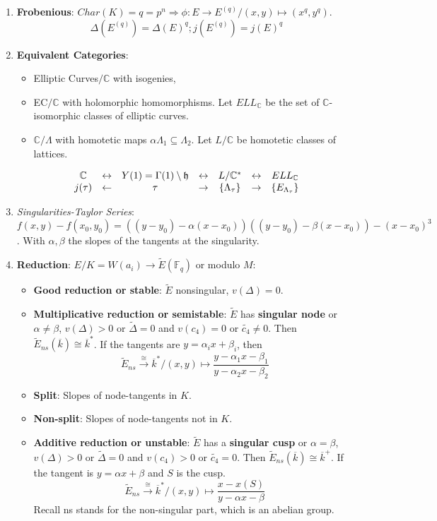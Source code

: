 \documentclass{article}
\newcommand{\C}{\mathbb{C}}
\newcommand{\F}{\mathbb{F}}
\newcommand{\hh}{\mathfrak{h}}
\newcommand{\ra}{\rightarrow}
\newcommand{\la}{\leftarrow}
\newcommand{\Ra}{\Rightarrow}
\newcommand{\lra}{\leftrightarrow}
\newcommand{\raa}[1]{\overset{#1}{\longrightarrow}}
\begin{document}
\begin{multicols}{2}
\begin{enumerate}
\item \textbf{Frobenious}: $Char(K) = q = p^n \Ra \phi: E \ra E^{(q)}/ (x,y) \mapsto (x^q,y^q)$. 
\[\Delta(E^{(q)}) = \Delta(E)^q; j(E^{(q)}) = j(E)^q\]

\item \textbf{Equivalent Categories}: 
\begin{itemize} 
\item Elliptic Curves$/\C$ with isogenies, 
\item EC$/\C$ with holomorphic homomorphisms. Let $ELL_\C$ be the set of $\C$-isomorphic classes of elliptic curves.  
\item $\C/\Lambda$ with homotetic maps $\alpha \Lambda_1 \subseteq \Lambda_2$. Let $L/\C$ be homotetic classes of lattices.
\end{itemize}
\[\begin{array}{ccc ccc cc}
\C & \lra & Y(1) = \Gamma(1)\setminus \hh & \lra & L/\C^* & \lra & ELL_\C \\
j(\tau) & \la & \tau & \ra & \{\Lambda_\tau\} & \ra & \{E_{\Lambda_\tau}\}
\end{array}\]

\item \textit{Singularities-Taylor Series}: $f(x,y) - f(x_0,y_0) = ((y-y_0)-\alpha(x-x_0))((y-y_0)-\beta(x-x_0)) - (x-x_0)^3$. With $\alpha,\beta$ the slopes of the tangents at the singularity.

\item \textbf{Reduction}: $E/K = W(a_i) \ra \tilde{E}(\F_q)$ or modulo $M$: 
\begin{itemize}
\item \textbf{Good reduction or stable}: $\tilde{E}$ nonsingular, $v(\Delta) = 0$. 
\item \textbf{Multiplicative reduction or semistable}: $\tilde{E}$ has \textbf{singular node} or $\alpha \neq \beta$, $v(\Delta) > 0$ or $\tilde{\Delta} = 0$ and $v(c_4) = 0$ or $\tilde{c_4} \neq 0$. Then $\tilde{E}_{ns}(\overline{k}) \cong \overline{k}^*$. If the tangents are $y = \alpha_i x + \beta_i$, then 
\[\tilde{E}_{ns} \raa{\cong} \overline{k}^*/ (x,y) \mapsto \frac{y - \alpha_1x-\beta_1}{y-\alpha_2 x - \beta_2}\]
\item \textbf{Split}: Slopes of node-tangents in $K$.
\item \textbf{Non-split}: Slopes of node-tangents not in $K$.
\item  \textbf{Additive reduction or unstable}: $\tilde{E}$ has a \textbf{singular cusp} or $\alpha = \beta$, $v(\Delta) > 0$ or $\tilde{\Delta} = 0$ and $v(c_4) > 0$ or $\tilde{c_4} = 0$. Then $\tilde{E}_{ns}(\overline{k}) \cong \overline{k}^+$. If the tangent is $y = \alpha x + \beta$ and $S$ is the cusp.
\[\tilde{E}_{ns} \raa{\cong} \overline{k}^*/ (x,y) \mapsto \frac{x - x(S)}{y - \alpha x - \beta}\]
Recall ns stands for the non-singular part, which is an abelian group. 
\end{itemize}


\end{enumerate}
\end{multicols}
\end{document}
